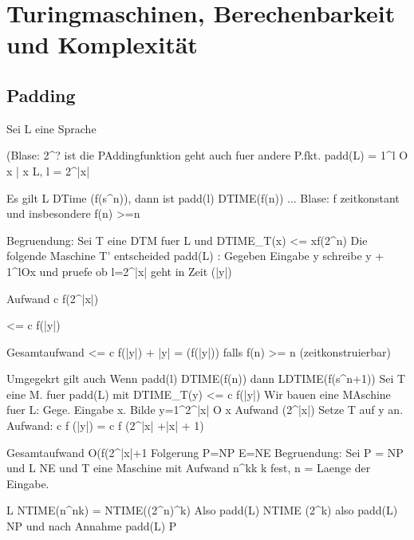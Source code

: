 




\chapter{Turingmaschinen, Berechenbarkeit und Komplexität} %
\label{cha:turingmaschinen_berechenbarkeit_und_komplexitaet}



\section{Padding}

Sei L \subseteq \sigma * eine Sprache

(Blase: 2^?  ist die PAddingfunktion geht auch fuer andere P.fkt.
padd(L) = {1^l O x | x \in L, l = 2^|x|}


Es gilt L \in DTime (f(s^n)), dann ist
padd(l) \in DTIME(f(n)) ... Blase: f zeitkonstant und insbesondere f(n) >=n

Begruendung:  Sei T eine DTM fuer L und
DTIME_T(x) <= \in xf(2^n)
Die folgende Maschine T' entscheided padd(L) :
Gegeben Eingabe y schreibe y + 1^lOx und pruefe ob l=2^|x|
geht in Zeit \bigO(|y|)

Aufwand c f(2^|x|)

<= c f(|y|)

Gesamtaufwand
<= c f(|y|) + |y|
= \bigO(f(|y|))
falls f(n) >= n (zeitkonstruierbar)


Umgegekrt gilt auch Wenn padd(l) \in DTIME(f(n))
dann L\in DTIME(f(s^{n+1}))
Sei T eine M. fuer padd(L)
mit DTIME_T(y) <= c f(|y|)
Wir bauen eine MAschine fuer L:
Gege. Eingabe x.  Bilde y=1^2^{|x|} O x
Aufwand \bigO(2^{|x|})
Setze T auf y an.
Aufwand: c f (|y|) = c f (2^{|x|} +|x| + 1)

Gesamtaufwand
O(f(2^{|x|+1}
Folgerung
P=NP \Rightarrow E=NE
Begruendung: Sei P = NP
und L \in NE und T eine Maschine mit Aufwand n^{kk}
k fest, n = Laenge der Eingabe.

L \in NTIME(n^{nk}) = NTIME((2^n)^k)
Also padd(L) \in NTIME  (2^k)
also padd(L) \in  NP und nach Annahme
padd(L) \in P

